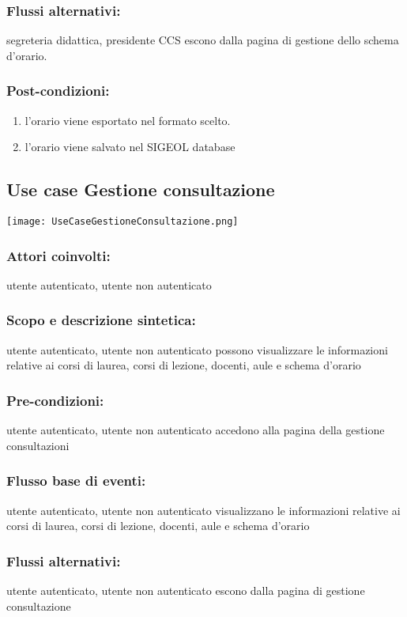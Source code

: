 \documentclass[11pt,a4paper]{article}
\begin{document}
\subsubsection*{Flussi alternativi:}
 segreteria didattica, presidente CCS escono dalla pagina di gestione dello schema d'orario.
\subsubsection*{Post-condizioni:}
\begin{enumerate}
 \item l'orario viene esportato nel formato scelto.
 \item l'orario viene salvato nel SIGEOL database
\end{enumerate}  

\subsection{Use case Gestione consultazione}
\begin{center} 
 \texttt{[image: UseCaseGestioneConsultazione.png]}
\end{center}
\subsubsection*{Attori coinvolti:}
utente autenticato, utente non autenticato
\subsubsection*{Scopo e descrizione sintetica:}
utente autenticato, utente non autenticato possono visualizzare le informazioni relative ai corsi di laurea, corsi di lezione, docenti, aule e schema d'orario
\subsubsection*{Pre-condizioni:}
utente autenticato, utente non autenticato accedono alla pagina della gestione consultazioni
\subsubsection*{Flusso base di eventi:}
utente autenticato, utente non autenticato visualizzano le informazioni relative ai corsi di laurea, corsi di lezione, docenti, aule e schema d'orario
\subsubsection*{Flussi alternativi:}
 utente autenticato, utente non autenticato escono dalla pagina di gestione consultazione
\end{document}
